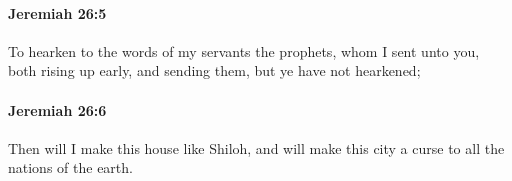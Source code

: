 		\paragraph{Jeremiah 26:5} %
			\label{JEREMIAH-26-5}

			To hearken to the words of my servants the prophets, whom I sent unto you, both rising up early, and sending them, but ye have not hearkened;


		\paragraph{Jeremiah 26:6} %
			\label{JEREMIAH-26-6}

			Then will I make this house like Shiloh, and will make this city a curse to all the nations of the earth.


